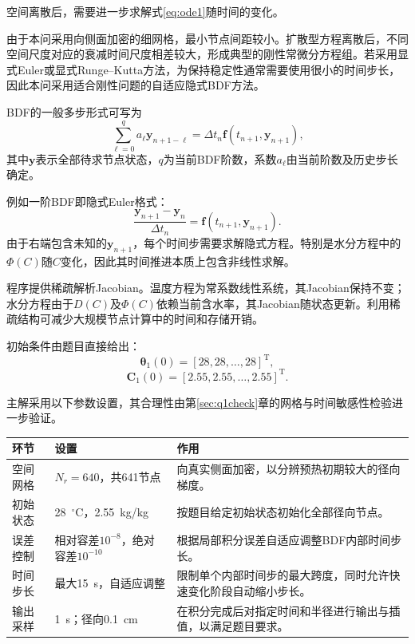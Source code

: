 \documentclass[withoutpreface]{cumcmthesis}
\begin{document}
空间离散后，需要进一步求解式\eqref{eq:ode1}随时间的变化。

由于本问采用向侧面加密的细网格，最小节点间距较小。扩散型方程离散后，不同空间尺度对应的衰减时间尺度相差较大，形成典型的刚性常微分方程组。若采用显式Euler或显式Runge--Kutta方法，为保持稳定性通常需要使用很小的时间步长，因此本问采用适合刚性问题的自适应隐式BDF方法\citep{Virtanen2020}。

BDF的一般多步形式可写为
\[
\sum_{\ell=0}^{q}
a_\ell
\boldsymbol y_{n+1-\ell}
=
\Delta t_n
\boldsymbol f
(t_{n+1},\boldsymbol y_{n+1}),
\]
其中$\boldsymbol y$表示全部待求节点状态，$q$为当前BDF阶数，系数$a_\ell$由当前阶数及历史步长确定。

例如一阶BDF即隐式Euler格式：
\[
\frac{
\boldsymbol y_{n+1}-\boldsymbol y_n
}{
\Delta t_n
}
=
\boldsymbol f
(t_{n+1},\boldsymbol y_{n+1}).
\]
由于右端包含未知的$\boldsymbol y_{n+1}$，每个时间步需要求解隐式方程。特别是水分方程中的$\Phi(C)$随$C$变化，因此其时间推进本质上包含非线性求解。

程序提供稀疏解析Jacobian。温度方程为常系数线性系统，其Jacobian保持不变；水分方程由于$D(C)$及$\Phi(C)$依赖当前含水率，其Jacobian随状态更新。利用稀疏结构可减少大规模节点计算中的时间和存储开销。

初始条件由题目直接给出：
\[
\boldsymbol\theta_1(0)
=
[28,28,\ldots,28]^{\mathrm T},
\]
\[
\boldsymbol C_1(0)
=
[2.55,2.55,\ldots,2.55]^{\mathrm T}.
\]

主解采用以下参数设置，其合理性由第\ref{sec:q1check}章的网格与时间敏感性检验进一步验证。

\begin{center}
\small
\begin{tabularx}{\textwidth}{p{2.6cm}p{3.3cm}X}
\toprule
环节 & 设置 & 作用\\
\midrule

空间网格
& $N_r=640$，共641节点
& 向真实侧面加密，以分辨预热初期较大的径向梯度。\\

初始状态
& 28~$^\circ$C，2.55~kg/kg
& 按题目给定初始状态初始化全部径向节点。\\

误差控制
& 相对容差$10^{-8}$，绝对容差$10^{-10}$
& 根据局部积分误差自适应调整BDF内部时间步长。\\

时间步长
& 最大15~s，自适应调整
& 限制单个内部时间步的最大跨度，同时允许快速变化阶段自动缩小步长。\\

输出采样
& 1~s；径向0.1~cm
& 在积分完成后对指定时间和半径进行输出与插值，以满足题目要求。\\

\bottomrule
\end{tabularx}
\end{center}
\end{document}
